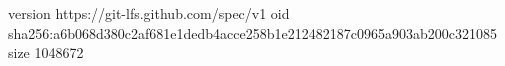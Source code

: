 version https://git-lfs.github.com/spec/v1
oid sha256:a6b068d380c2af681e1dedb4acce258b1e212482187c0965a903ab200c321085
size 1048672
